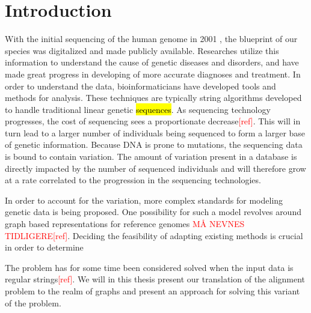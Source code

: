 \documentclass[thesis.tex]{subfiles}
\begin{document}
\chapter{Introduction}
With the initial sequencing of the human genome in 2001 \cite{human_genome}, the blueprint of our species was digitalized and made publicly available. Researches utilize this information to understand the cause of genetic diseases and disorders, and have made great progress in developing of more accurate diagnoses and treatment. In order to understand the data, bioinformaticians have developed tools and methods for analysis. These techniques are typically string algorithms developed to handle traditional linear genetic \hl{sequences}. As sequencing technology progresses, the cost of sequencing sees a proportionate decrease\textcolor{red}{[ref]}. This will in turn lead to a larger number of individuals being sequenced to form a larger base of genetic information. Because DNA is prone to mutations, the sequencing data is bound to contain variation. The amount of variation present in a database is directly impacted by the number of sequenced individuals and will therefore grow at a rate correlated to the progression in the sequencing technologies.\\
\par\noindent
In order to account for the variation, more complex standards for modeling genetic data is being proposed. One possibility for such a model revolves around graph based representations for reference genomes \textcolor{red}{MÅ NEVNES TIDLIGERE}\textcolor{red}{[ref]}.  Deciding the feasibility of adapting existing methods is crucial in order to determine \\
\par\noindent
{} The problem has for some time been considered solved when the input data is regular strings\textcolor{red}{[ref]}. We will in this thesis present our translation of the alignment problem to the realm of graphs and present an approach for solving this variant of the problem.
\end{document}
